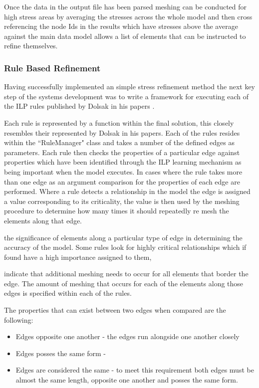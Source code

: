 \documentclass{article}
\begin{document}
Once the data in the output file has been parsed meshing can be conducted for high stress areas by averaging the stresses across the whole model and then cross referencing the node Ids in the results which have stresses above the average against the main data model allows a list of elements that can be instructed to refine themselves.


\subsubsection{Rule Based Refinement}
Having successfully implemented an simple stress refinement method the next key step of the systems development was to write a framework for executing each of the ILP rules published by Dolsak in his papers \cite{DolsakPaper91, DolsakPaper94, appOfILPToFEMeshDesign} \cite{ConsultRuleIntelltSystemFE}.

Each rule is represented by a function within the final solution, this closely resembles their represented by Dolsak in his papers. Each of the rules resides within the ``RuleManager" class and takes a number of the defined edges as parameters. Each rule then checks the properties of a particular edge against properties which have been identified through the ILP learning mechanism as being important when the model executes. In cases where the rule takes more than one edge as an argument comparison for the properties of each edge are performed. Where a rule detects a relationship in the model the edge is assigned a value corresponding to its criticality, the value is then used by the meshing procedure to determine how many times it should repeatedly re mesh the elements along that edge.


 the significance of elements along a particular type of edge in determining the accuracy of the model. Some rules look for highly critical relationships  which if found have a high importance assigned to them, 

indicate that additional meshing needs to occur for all elements that border the edge. The amount of meshing that occurs for each of the elements along those edges is specified within each of the rules.

The properties that can exist between two edges when compared are the following:

\begin{itemize}
\item Edges opposite one another - the edges run alongside one another closely
\item Edges posses the same form - 

\item Edges are considered the same - to meet this requirement both edges must be almost the same length, opposite one another and posses the same form.

\end{itemize}
\end{document}
